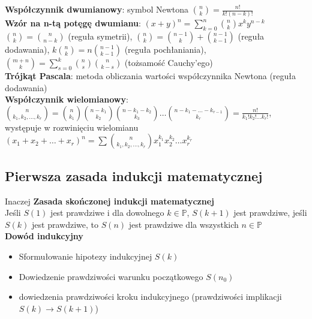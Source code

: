 \documentclass[a4paper,12pt]{article}
\begin{document}
\textbf{Współczynnik dwumianowy}: symbol Newtona ${{n}\choose {k}}=\frac{n!}{k!(n-k)!}$ \\
\textbf{Wzór na n-tą potęgę dwumianu}: $(x+y)^n=\sum_{k=0}^n {{n}\choose{k}}x^ky^{n-k}$ \\
${{n}\choose{k}}={{n}\choose{n-k}}$ (reguła symetrii), 
${{n}\choose{k}}={{n-1}\choose{k}}+{{n-1}\choose{k-1}}$ (reguła dodawania), 
$k{{n}\choose{k}}=n{{n-1}\choose{k-1}}$ (reguła pochłaniania), 
${{m+n}\choose{k}}=\sum_{s=0}^k {{n}\choose{s}}{{n}\choose{k-s}}$ (tożsamość Cauchy'ego) \\
\textbf{Trójkąt Pascala}: metoda obliczania wartości współczynnika Newtona (reguła dodawania)\\
\textbf{Współczynnik wielomianowy}: ${{n}\choose{k_1, k_2, \dots ,k_r}}={{n}\choose{k_1}}{{n-k_1}\choose{k_2}}{{n-k_1-k_2}\choose{k_3}}\dots {{n-k_1-\hdots -k_{r-1}}\choose{k_r}}=\frac{n!}{k_1!k_2!\dots k_r!}$, występuje w rozwinięciu wielomianu $(x_1+x_2+\dots +x_r)^n=\sum {{n}\choose{k_1, k_2, \dots ,k_r}}x_1^{k_1}x_2^{k_2}\dots x_ r^{k_r}$
\subsection{Pierwsza zasada indukcji matematycznej}
Inaczej \textbf{Zasada skończonej indukcji matematycznej} \\
Jeśli $S(1)$ jest prawdziwe i dla dowolnego $k \in \mathbb{P}$, $S(k+1)$ jest prawdziwe, jeśli $S(k)$ jest prawdziwe, to $S(n)$ jest prawdziwe dla wszystkich $n \in \mathbb{P}$ \\ %

\textbf{Dowód indukcyjny}
\begin{itemize} \itemsep1pt \parskip0pt 
 \item Sformułowanie hipotezy indukcyjnej $S(k)$
 \item Dowiedzenie prawdziwości warunku początkowego $S(n_0)$
 \item dowiedzenia prawdziwości kroku indukcyjnego (prawdziwości implikacji $S(k)\rightarrow S(k+1)$)
\end{itemize}
\end{document}
